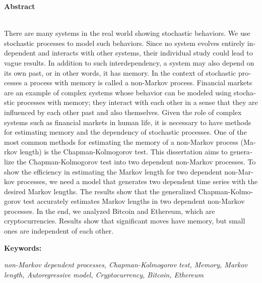 \begin{latin}
\newpage
\thispagestyle{empty}
\noindent
\centerline{\textbf{\large{Abstract}}}
\\
There are many systems in the real world showing stochastic behaviors. We use stochastic processes to model such behaviors. Since no system evolves entirely independent and interacts with other systems, their individual study could lead to vague results. In addition to such interdependency, a system may also depend on its own past, or in other words, it has memory. In the context of stochastic processes a process with memory is called a non­-Markov process. Financial markets are an example of complex systems whose behavior can be modeled using stochastic processes with memory; they interact with each other in a sense that they are influenced by each other past and also themselves. Given the role of complex systems such as financial markets in human life, it is necessary to have methods for estimating memory and the dependency of stochastic processes. One of the most common methods for estimating the memory of a non-Markov process (Markov length) is the Chapman-Kolmogorov test. This dissertation aims to generalize the Chapman-Kolmogorov test into two dependent non-Markov processes. To show the efficiency in estimating the Markov length for two dependent non-Markov processes, we need a model that generates two dependent time series with the desired Markov lengths. The results show that the generalized Chapman-Kolmogorov test accurately estimates Markov lengths in two dependent non-Markov processes. In the end, we analyzed Bitcoin and Ethereum, which are cryptocurrencies. Results show that significant moves have memory, but small ones are independent of each other.

\textbf{Keywords:}

\textit{non-Markov dependent processes, Chapman-Kolmogorov test, Memory, Markov length, Autoregressive model, Cryptocurrency, Bitcoin, Ethereum}
\end{latin}